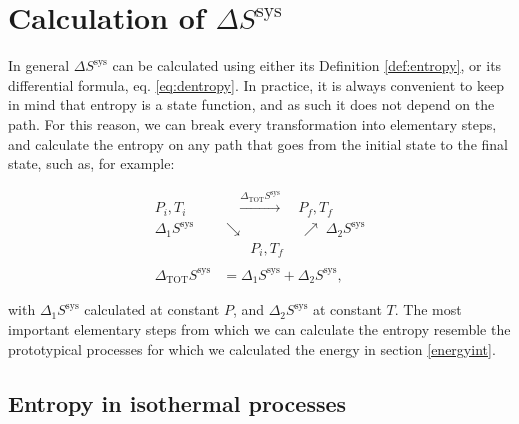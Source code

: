 \documentclass[
  9pt,
]{extbook}
\theoremstyle{definition}
\theoremstyle{definition}
\theoremstyle{definition}
\theoremstyle{remark}
\begin{document}
\hypertarget{dssys}{%
\section{\texorpdfstring{Calculation of \(\Delta S^{\mathrm{sys}}\)}{Calculation of \textbackslash Delta S\^{}\{\textbackslash mathrm\{sys\}\}}}\label{dssys}}

In general \(\Delta S^{\mathrm{sys}}\) can be calculated using either its Definition \ref{def:entropy}, or its differential formula, eq. \eqref{eq:dentropy}. In practice, it is always convenient to keep in mind that entropy is a state function, and as such it does not depend on the path. For this reason, we can break every transformation into elementary steps, and calculate the entropy on any path that goes from the initial state to the final state, such as, for example:

\begin{equation}
\begin{aligned}
P_i, T_i & \quad \xrightarrow{ \Delta_{\text{TOT}} S^{\text{sys}} } \quad P_f, T_f \\
  \scriptstyle{\Delta_1 S^{\text{sys}}} & \searrow \qquad  \qquad \nearrow \; \scriptstyle{\Delta_2 S^{\text{sys}}} \\
& \qquad P_i, T_f \\
\\
\Delta_{\text{TOT}} S^{\text{sys}} & = \Delta_1 S^{\text{sys}} + \Delta_2 S^{\text{sys}},
\end{aligned}
\label{eq:entropycycle}
\end{equation}

with \(\Delta_1 S^{\text{sys}}\) calculated at constant \(P\), and \(\Delta_2 S^{\text{sys}}\) at constant \(T\). The most important elementary steps from which we can calculate the entropy resemble the prototypical processes for which we calculated the energy in section \ref{energyint}.

\hypertarget{entropy-in-isothermal-processes}{%
\subsection{Entropy in isothermal processes}\label{entropy-in-isothermal-processes}}
\end{document}
